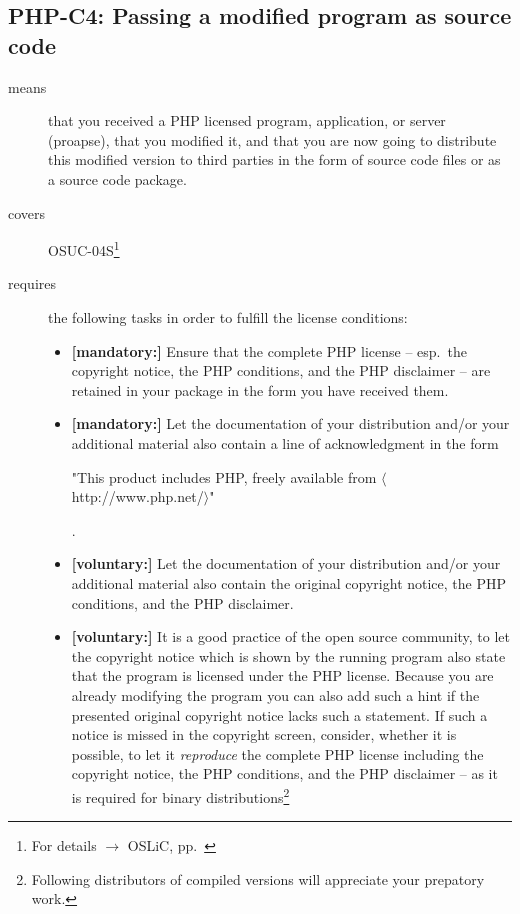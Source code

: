 \subsection{PHP-C4: Passing a modified program as source code}
\label{OSUC-04S-PHP}

\begin{description}
\item[means] that you received a PHP licensed program, application, or
  server (proapse), that you modified it, and that you are now going to
  distribute this modified version to third parties in the form of source code files or as
  a source code package.

\item[covers] OSUC-04S\footnote{For details $\rightarrow$ OSLiC, pp.\
\pageref{OSUC-04S-DEF}}
\item[requires] the following tasks in order to fulfill the license conditions:
\begin{itemize}

  \item \textbf{[mandatory:]} Ensure that the complete PHP license -- esp.\
  the copyright notice, the PHP conditions, and the PHP disclaimer -- are
  retained in your package in the form you have received them.
  
  \item \textbf{[mandatory:]} Let the documentation of your distribution and/or
  your additional material also contain a line of acknowledgment in the form
  \begin{footnotesize}"This product includes PHP, freely available from
  $\langle$http://www.php.net/$\rangle$"\end{footnotesize}.
    
  \item \textbf{[voluntary:]} Let the documentation of your distribution and/or
  your additional material also contain the original copyright notice, the PHP
  conditions, and the PHP disclaimer.
     
  \item \textbf{[voluntary:]} It is a good practice of the open source
  community, to let the copyright notice which is shown by the running program
  also state that the program is licensed under the PHP license. Because you are
  already modifying the program you can also add such a hint if the presented
  original copyright notice lacks such a statement. If such a notice is missed
  in the copyright screen, consider, whether it is possible, to let it
  \emph{reproduce} the complete PHP license including the copyright notice, the
  PHP conditions, and the PHP disclaimer -- as it is required for binary
  distributions\footnote{Following distributors of compiled versions will
  appreciate your prepatory work.}
  

\end{itemize}
\end{description}
